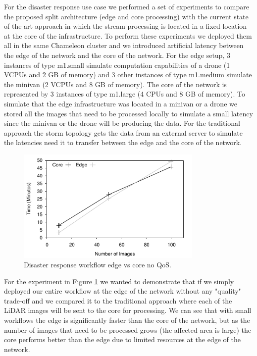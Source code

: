 For the disaster response use case we performed a set of experiments to compare the proposed split architecture (edge and core processing) with the current state of the art approach in which the stream processing is located in a fixed location at the core of the infrastructure. To perform these experiments we deployed them all in the same Chameleon cluster and we introduced artificial latency between the edge of the network and the core of the network. For the edge setup, 3 instances of type m1.small simulate computation capabilities of a drone (1 VCPUs and 2 GB of memory) and 3 other instances of type m1.medium simulate the minivan (2 VCPUs and 8 GB of memory). The core of the network is represented by 3 instances of type m1.large (4 CPUs and 8 GB of memory). To simulate that the edge infrastructure was located in a minivan or a drone we stored all the images that need to be processed locally to simulate a small latency since the minivan or the drone will be producing the data. For the traditional approach the storm topology gets the data from an external server to simulate the latencies need it to transfer between the edge and the core of the network.

\begin{figure}[h]
  \centering
  \includegraphics[width=0.8\textwidth]{Results/EdgeVCore}
  \caption{Disaster response workflow edge vs core no QoS.}
  \label{fig:Edge_CoreVsCloud}
\end{figure}

For the experiment in Figure \ref{fig:Edge_CoreVsCloud} we wanted to demonstrate that if we simply deployed our entire workflow at the edge of the network without any "quality" trade-off and we compared it to the traditional approach where each of the LiDAR images will be sent to the core for processing. We can see that with small workflows the edge is significantly faster than the core of the network, but as the number of images that need to be processed grows (the affected area is large) the core performs better than the edge due to limited resources at the edge of the network.

